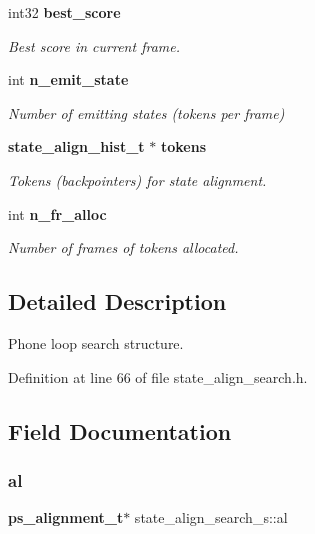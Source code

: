 \begin{DoxyCompactItemize}
int32 \textbf{ best\+\_\+score}
\begin{DoxyCompactList}\small\item\em Best score in current frame. \end{DoxyCompactList}\item 
\mbox{\label{structstate__align__search__s_a80c74bac917a8203bb74f5738621ce83}} 
int \textbf{ n\+\_\+emit\+\_\+state}
\begin{DoxyCompactList}\small\item\em Number of emitting states (tokens per frame) \end{DoxyCompactList}\item 
\textbf{ state\+\_\+align\+\_\+hist\+\_\+t} $\ast$ \textbf{ tokens}
\begin{DoxyCompactList}\small\item\em Tokens (backpointers) for state alignment. \end{DoxyCompactList}\item 
int \textbf{ n\+\_\+fr\+\_\+alloc}
\begin{DoxyCompactList}\small\item\em Number of frames of tokens allocated. \end{DoxyCompactList}\end{DoxyCompactItemize}


\subsection{Detailed Description}
Phone loop search structure. 

Definition at line 66 of file state\+\_\+align\+\_\+search.\+h.



\subsection{Field Documentation}
\mbox{\label{structstate__align__search__s_a47b9b509c7416f8952ee452d8ce7dda6}} 
\subsubsection{al}
{\footnotesize\ttfamily \textbf{ ps\+\_\+alignment\+\_\+t}$\ast$ state\+\_\+align\+\_\+search\+\_\+s\+::al}




